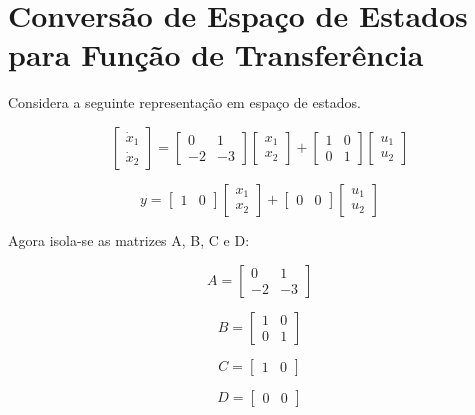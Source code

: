  \section{Conversão de Espaço de Estados para Função de Transferência}
 Considera a seguinte representação em espaço de estados.
 
 $$
\begin{bmatrix}
\dot{x}_{1}\\\dot{x}_{2}
\end{bmatrix} = \begin{bmatrix}
0 & 1\\
-2 & -3
\end{bmatrix} \begin{bmatrix}
x_{1}\\x_{2}
\end{bmatrix}+\begin{bmatrix}
1 & 0\\
0 & 1
\end{bmatrix} \begin{bmatrix}
u_{1}\\u_{2}
\end{bmatrix}
$$

$$
y=\begin{bmatrix}
1 & 0
\end{bmatrix} \begin{bmatrix}
x_{1} \\ x_{2}
\end{bmatrix} + \begin{bmatrix}
0 & 0
\end{bmatrix} \begin{bmatrix}
u_{1} \\ u_{2}
\end{bmatrix}
$$

Agora isola-se as matrizes A, B, C e D:

$$A=\begin{bmatrix}
    0 & 1 \\
    -2 & -3
\end{bmatrix}$$

$$B=\begin{bmatrix}
    1 & 0 \\
    0 & 1
\end{bmatrix}$$

$$C=\begin{bmatrix}
    1 & 0
\end{bmatrix}$$

$$D=\begin{bmatrix}
    0 & 0
\end{bmatrix}$$

